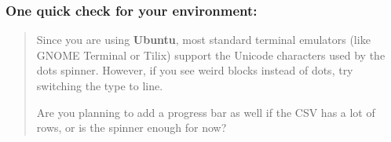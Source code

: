\hypertarget{one-quick-check-for-your-environment}{%
\subsubsection{\texorpdfstring{\textbf{One quick check for your
environment:}}{One quick check for your environment:}}\label{one-quick-check-for-your-environment}}

\begin{quote}
Since you are using \textbf{Ubuntu}, most standard terminal emulators
(like GNOME Terminal or Tilix) support the Unicode characters used by
the dots spinner. However, if you see weird blocks instead of dots, try
switching the type to line.

Are you planning to add a progress bar as well if the CSV has a lot of
rows, or is the spinner enough for now?
\end{quote}
